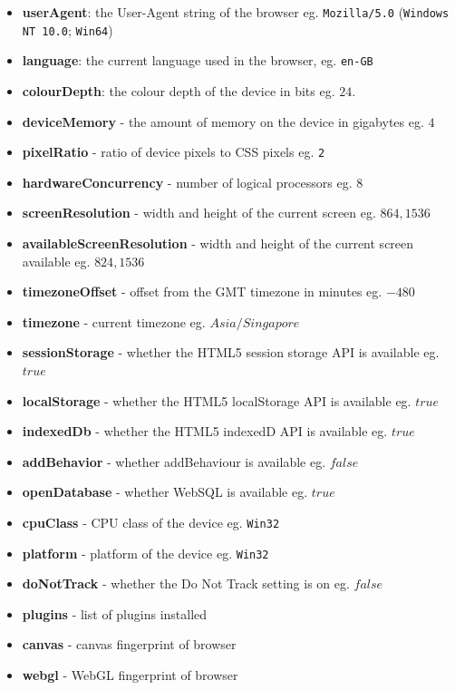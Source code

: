\documentclass{acm_proc_article-sp}
\begin{document}
\begin{itemize}
    \item \textbf{userAgent}: the User-Agent string of the browser eg. \verb|Mozilla/5.0| (\verb|Windows NT 10.0|; \verb|Win64|)
    \item \textbf{language}: the current language used in the browser, eg. \verb|en-GB|
    \item \textbf{colourDepth}:  the colour depth of the device in bits eg. $24$.
    \item\textbf{ deviceMemory} - the amount of memory on the device in gigabytes eg. $4$
    \item\textbf{ pixelRatio} - ratio of device pixels to CSS pixels eg. \verb|2|
    \item\textbf{ hardwareConcurrency} - number of logical processors eg. $8$
    \item\textbf{ screenResolution} - width and height of the current screen eg. $864,1536$
    \item\textbf{ availableScreenResolution} - width and height of the current screen available eg. $824,1536$
    \item\textbf{  timezoneOffset} - offset from the GMT timezone in minutes eg. $-480$
    \item\textbf{ timezone} - current timezone eg. $Asia/Singapore$
    \item\textbf{ sessionStorage} - whether the HTML5 session storage API is available eg. $true$
    \item\textbf{ localStorage} - whether the HTML5 localStorage API is available eg. $true$
    \item\textbf{ indexedDb} - whether the HTML5 indexedD API is available eg. $true$
    \item\textbf{ addBehavior} - whether addBehaviour is available eg. $false$
    \item\textbf{ openDatabase} - whether WebSQL is available eg. $true$
    \item\textbf{ cpuClass} - CPU class of the device eg. \verb|Win32|
    \item\textbf{ platform} - platform of the device eg. \verb|Win32|
    \item\textbf{ doNotTrack} - whether the Do Not Track setting is on eg. $false$
    \item\textbf{ plugins} - list of plugins installed
    \item\textbf{ canvas} - canvas fingerprint of browser
    \item\textbf{ webgl} - WebGL fingerprint of browser

\end{itemize}
\end{document}
